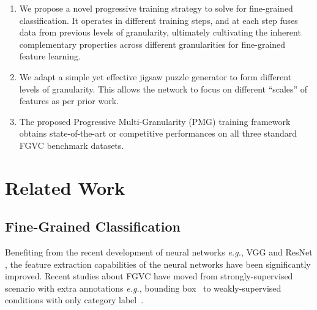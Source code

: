 \documentclass{llncs}
\begin{document}
  \begin{enumerate}
  \item We propose a novel progressive training strategy to solve for fine-grained classification. It operates in different training steps, and at each step fuses data from previous levels of granularity, ultimately cultivating the inherent complementary properties across different granularities for fine-grained feature learning.
    
   \item We adapt a simple yet effective jigsaw puzzle generator to form different levels of granularity. This allows the network to focus on different ``scales'' of features as per prior work.
    
    \item The proposed Progressive Multi-Granularity (PMG) training framework obtains state-of-the-art or competitive performances on all three standard FGVC benchmark datasets.
    \end{enumerate}


\section{Related Work}

\subsection{Fine-Grained Classification}

Benefiting from the recent development of neural networks \emph{e.g.}, VGG \cite{simonyan2014very} and ResNet \cite{he2016deep}, the feature extraction capabilities of the neural networks have been significantly improved. Recent studies about FGVC have moved from strongly-supervised scenario with extra annotations \emph{e.g.}, bounding box~\cite{berg2013poof,lei2016fast,xie2013hierarchical,zhang2014part,huang2016part} to weakly-supervised conditions with only category label~\cite{fu2017look,zheng2017learning,yang2018learning,ge2019weakly,zhang2019learning}. 
\end{document}
